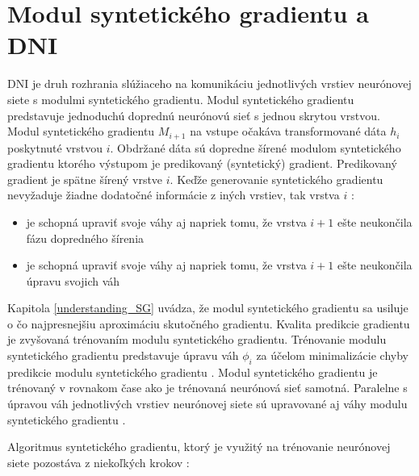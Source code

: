 \section{Modul syntetického gradientu a DNI}
\label{SGaDNI}

DNI je druh rozhrania slúžiaceho na komunikáciu jednotlivých vrstiev neurónovej siete s modulmi syntetického gradientu. Modul syntetického gradientu predstavuje jednoduchú doprednú neurónovú sieť s jednou skrytou vrstvou. Modul syntetického gradientu $M_{i+1}$ na vstupe očakáva transformované dáta $h_i$ poskytnuté vrstvou $i$. Obdržané dáta sú dopredne šírené modulom syntetického gradientu ktorého výstupom je predikovaný (syntetický) gradient. Predikovaný gradient je spätne šírený vrstve $i$. Keďže generovanie syntetického gradientu nevyžaduje žiadne dodatočné informácie z iných vrstiev, tak vrstva $i$ \cite{Jaderberg2016}:
\begin{itemize}
\item je schopná upraviť svoje váhy aj napriek tomu, že vrstva $i+1$ ešte neukončila fázu dopredného šírenia
\item je schopná upraviť svoje váhy aj napriek tomu, že vrstva $i+1$ ešte neukončila úpravu svojich váh
\end{itemize}

Kapitola \ref{understanding_SG} uvádza, že modul syntetického gradientu sa usiluje o čo najpresnejšiu aproximáciu skutočného gradientu. Kvalita predikcie gradientu je zvyšovaná trénovaním modulu syntetického gradientu. Trénovanie modulu syntetického gradientu predstavuje úpravu váh $\phi_i$ za účelom minimalizácie chyby predikcie modulu syntetického gradientu \cite{Jaderberg2016}. Modul syntetického gradientu je trénovaný v rovnakom čase ako je trénovaná neurónová sieť samotná.  Paralelne s úpravou váh jednotlivých vrstiev neurónovej siete sú upravované aj váhy modulu syntetického gradientu \cite{Czarnecki2017}.

Algoritmus syntetického gradientu, ktorý je využitý na trénovanie neurónovej siete pozostáva z niekoľkých krokov \cite{Jaderberg2016, Czarnecki2017}:

